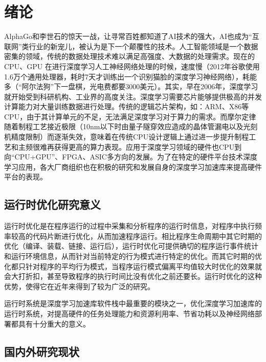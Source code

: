 
\chapter{绪论}

AlphaGo和李世石的惊天一战，让寻常百姓都知道了AI技术的强大，AI也成为“互联网”类行业的新宠儿，被认为是下一个颠覆性的技术。人工智能领域是一个数据密集的领域，传统的数据处理技术难以满足高强度、大数据的处理需求\cite{cyj}。现在的 CPU、GPU 在进行深度学习人工神经网络处理的时候，速度慢（2012年谷歌使用1.6万个通用处理器，耗时7天才训练出一个识别猫脸的深度学习神经网络），耗能多（“阿尔法狗”下一盘棋，光电费都要3000美元）。其实，早在2006年，深度学习就开始受到科研机构、工业界的高度关注。深度学习需要芯片能够提供极高的并发计算能力对大量训练数据进行处理\cite{szjxl}。传统的逻辑芯片架构，如：ARM、X86等CPU，由于其计算单元的不足，无法满足深度学习对于算力的需求。而摩尔定律随着制程工艺接近极限（10nm以下时由量子隧穿效应造成的晶体管漏电以及光刻机精度限制）而逐渐失效，意味着在传统CPU设计逻辑上通过进一步提升制程工艺和主频很难再获得更高的算力表现\cite{ljwly}。应用于深度学习领域的硬件也CPU到向“CPU+GPU”、FPGA、ASIC多方向的发展\cite{jdk}。为了在特定的硬件平台技术深度学习应用，各大厂商组织也在积极的研究和发展自身的深度学习加速库来提高硬件平台的表现。

\section{运行时优化研究意义}

运行时优化是在程序运行的过程中采集和分析程序的运行时信息，对程序中执行频率较高的代码片断进行优化，从而加速程序运行\cite{wangjin}。相比程序生命周期中其它时期的优化（编译、装载、链接、运行后），运行时优化可提供确切的程序运行事件统计和运行环境信息，从而针对当前特定的行为模式进行特定的优化\cite{frosenb}。而其它时期的优化都只针对程序的平均行为模式，当程序运行模式偏离平均值较大时优化的效果就会大打折扣，甚至导致程序的执行时间比没有优化之前还要长\cite{gzyll}。运行时优化的这种优势，使得它在近年来得到了较为广泛的研究。

运行时系统是深度学习加速库软件栈中最重要的模块之一，优化深度学习加速库的运行时系统，对提高硬件的任务处理能力和资源利用率、节省功耗以及神经网络部署都具有十分重大的意义。

\section{国内外研究现状}

